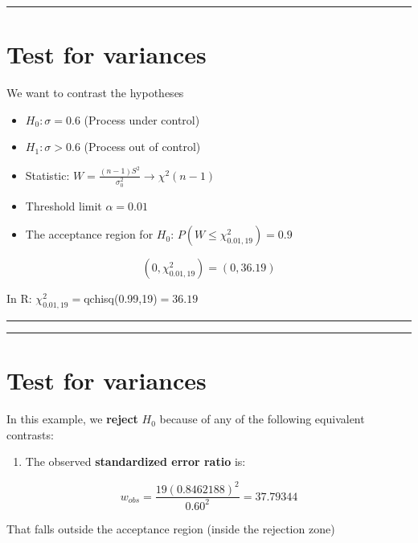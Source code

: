 \documentclass[
]{book}
\providecommand{\tightlist}{%
  \setlength{\itemsep}{0pt}\setlength{\parskip}{0pt}}
\begin{document}
\begin{center}\rule{0.5\linewidth}{0.5pt}\end{center}

\hypertarget{test-for-variances-4}{%
\section{Test for variances}\label{test-for-variances-4}}

We want to contrast the hypotheses

\begin{itemize}
\item
  \(H_0:\sigma=0.6\) (Process under control)
\item
  \(H_1:\sigma > 0.6\) (Process out of control)
\item
  Statistic: \(W=\frac{(n-1)S^2}{\sigma_0^2} \rightarrow \chi^2(n-1)\)
\item
  Threshold limit \(\alpha=0.01\)
\item
  The acceptance region for \(H_0\): \(P(W\leq \chi^2_{0.01,19})=0.9\)
\end{itemize}

\[(0, \chi^2_{0.01,19})=(0,36.19)\]

In R: \(\chi^2_{0.01,19}=\)qchisq(0.99,19)\(= 36.19\)

\begin{center}\rule{0.5\linewidth}{0.5pt}\end{center}

\begin{center}\rule{0.5\linewidth}{0.5pt}\end{center}

\hypertarget{test-for-variances-5}{%
\section{Test for variances}\label{test-for-variances-5}}

In this example, we \textbf{reject} \(H_0\) because of any of the following equivalent contrasts:

\begin{enumerate}
\def\labelenumi{\arabic{enumi}.}
\tightlist
\item
  The observed \textbf{standardized error ratio} is:
\end{enumerate}

\[w_{obs}=\frac{19 (0.8462188)^2}{0.60^2}=37.79344\]

That falls outside the acceptance region (inside the rejection zone)
\end{document}
